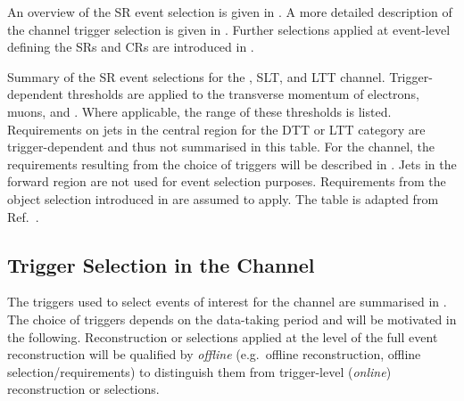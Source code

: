 An overview of the SR event selection is given in . A
more detailed description of the \hadhad channel trigger selection is given in
. Further selections applied at event-level
defining the SRs and CRs are introduced in .

\begin{table}[htbp]
  \centering

  \caption{Summary of the SR event selections for the \hadhad, \lephad SLT, and
    \lephad LTT channel. Trigger-dependent thresholds are applied to the
    transverse momentum of electrons, muons, and \tauhadvis. Where applicable,
    the range of these thresholds is listed.  Requirements on jets in the
    central region for the DTT or LTT category are trigger-dependent and thus
    not summarised in this table. For the \hadhad channel, the requirements
    resulting from the choice of triggers will be described in
    . Jets in the forward region are not used
    for event selection purposes. Requirements from the object selection
    introduced in  are assumed to apply. The
    table is adapted from Ref.~\cite{HDBS-2018-40}.}%
  \label{tab:event_selection}

  \resizebox{\textwidth}{!}{
    
  }
\end{table}


\subsection{Trigger Selection in the \hadhad Channel}%
\label{sec:trigger}%
\label{sec:hadhad_trigger_selection}

The triggers used to select events of interest for the \hadhad channel
are summarised in . The choice of triggers
depends on the data-taking period and will be motivated in the
following. Reconstruction or selections applied at the level of the
full event reconstruction will be qualified by \emph{offline} (e.g.\
offline reconstruction, offline selection/requirements) to distinguish
them from trigger-level (\emph{online}) reconstruction or selections.

